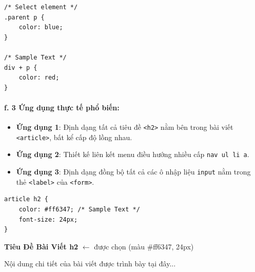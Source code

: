 \documentclass[11pt,oneside]{book}
\newcommand{\codeinline}[1]{\textcolor{accentOrange}{\texttt{#1}}}
\begin{document}
\begin{codeWindow}
\begin{lstlisting}[language=CSS3]
/* Select element */
.parent p {
    color: blue;
}

/* Sample Text */
div + p {
    color: red;
}
\end{lstlisting}
\end{codeWindow}

\paragraph{f. 3 Ứng dụng thực tế phổ biến:}

\begin{tipBox}
\begin{itemize}[leftmargin=1.5em, itemsep=3pt, parsep=0pt]
    \item \textbf{Ứng dụng 1}: Định dạng tất cả tiêu đề \codeinline{<h2>} nằm bên trong bài viết \codeinline{<article>}, bất kể cấp độ lồng nhau.
    \item \textbf{Ứng dụng 2}: Thiết kế liên kết menu điều hướng nhiều cấp \codeinline{nav ul li a}.
    \item \textbf{Ứng dụng 3}: Định dạng đồng bộ tất cả các ô nhập liệu \codeinline{input} nằm trong thẻ \codeinline{<label>} của \codeinline{<form>}.
\end{itemize}
\end{tipBox}

\begin{codeWindow}
\begin{lstlisting}[language=CSS3]
article h2 {
    color: #ff6347; /* Sample Text */
    font-size: 24px;
}
\end{lstlisting}
\end{codeWindow}

\begin{browserWindow}
\sffamily\small
\begin{tcolorbox}[arc=3pt, colback=white, colframe=gray!30, boxrule=1pt, title={\sffamily\scriptsize\color{darkText}<article> (Khối bài viết)}]
{\color{red!80!black}\bfseries\Large Tiêu Đề Bài Viết h2} {\small\textcolor{gray!60}{$\leftarrow$ được chọn (màu \#ff6347, 24px)}} \par\vspace{4pt}
\textcolor{darkText}{Nội dung chi tiết của bài viết được trình bày tại đây...}
\end{tcolorbox}
\end{browserWindow}
\end{document}
